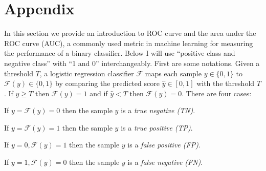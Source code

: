 \documentclass[12pt]{article}
\begin{document}
\printbibliography
\clearpage

\section{Appendix}\label{appendix-roc}
In this section we provide an introduction to ROC curve and the area under the ROC curve (AUC), a commonly used metric in machine learning for measuring the performance of a binary classifier. Below I will use ``positive class and negative class'' with ``1 and 0'' interchangeably. First are some notations. Given a threshold $T$, a logistic regression classifier $\mathcal{F}$ maps each sample $y\in\{0,1\}$ to $\mathcal{F}(y)\in\{0,1\}$ by comparing the predicted score $\hat{y}\in[0,1]$ with the threshold $T$. If $\hat{y}\geq T$ then $\mathcal{F}(y)=1$ and if $\hat{y} < T$ then $\mathcal{F}(y)=0$. There are four cases:
\bi
\item If $y = \mathcal{F}(y) = 0$ then the sample $y$ is a \emph{true negative (TN)}.
\item If $y = \mathcal{F}(y) = 1$ then the sample $y$ is a \emph{true positive (TP)}.
\item If $y = 0, \mathcal{F}(y) = 1$ then the sample $y$ is a \emph{false positive (FP)}.
\item If $y = 1, \mathcal{F}(y) = 0$ then the sample $y$ is a \emph{false negative (FN)}.
\ei
\end{document}
